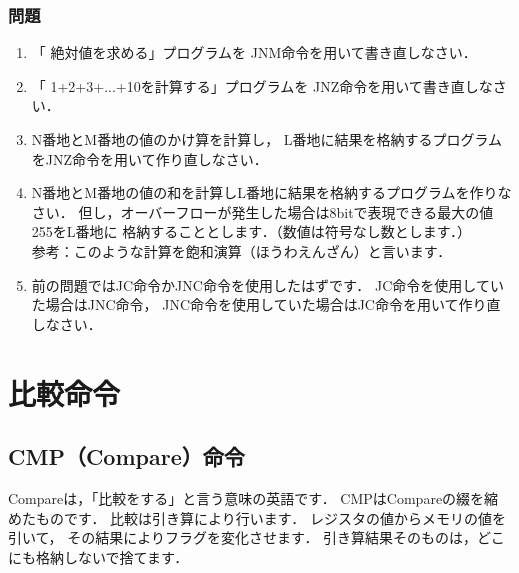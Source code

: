 \vfill
\subsubsection{問題}
\begin{enumerate}
\item 「 絶対値を求める」プログラムを
JNM命令を用いて書き直しなさい．

\item 「 1+2+3+...+10を計算する」プログラムを
JNZ命令を用いて書き直しなさい．

\item N番地とM番地の値のかけ算を計算し，
L番地に結果を格納するプログラムをJNZ命令を用いて作り直しなさい．

\item N番地とM番地の値の和を計算しL番地に結果を格納するプログラムを作りなさい．
但し，オーバーフローが発生した場合は8bitで表現できる最大の値255をL番地に
格納することとします．（数値は符号なし数とします．）\\
参考：このような計算を飽和演算（ほうわえんざん）と言います．

\item 前の問題ではJC命令かJNC命令を使用したはずです．
JC命令を使用していた場合はJNC命令，
JNC命令を使用していた場合はJC命令を用いて作り直しなさい．
\end{enumerate}
\vfill

\newpage
\section{比較命令}
\label{comp}

\subsection{CMP（Compare）命令}
Compareは，「比較をする」と言う意味の英語です．
CMPはCompareの綴を縮めたものです．
比較は引き算により行います．
レジスタの値からメモリの値を引いて，
その結果によりフラグを変化させます．
引き算結果そのものは，どこにも格納しないで捨てます．

